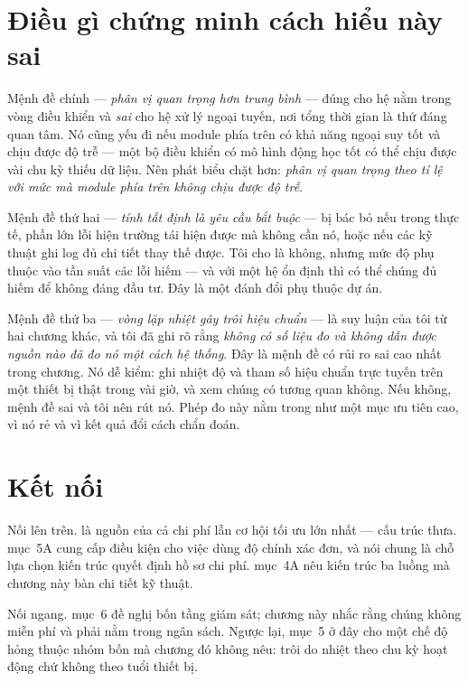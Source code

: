 \documentclass[../../vslam.tex]{subfiles}
\begin{document}
\section{Điều gì chứng minh cách hiểu này sai}

Mệnh đề chính --- \emph{phân vị quan trọng hơn trung bình} --- đúng cho hệ nằm trong vòng điều khiển và \emph{sai} cho hệ xử lý ngoại tuyến, nơi tổng thời gian là thứ đáng quan tâm. Nó cũng yếu đi nếu module phía trên có khả năng ngoại suy tốt và chịu được độ trễ --- một bộ điều khiển có mô hình động học tốt có thể chịu được vài chu kỳ thiếu dữ liệu. Nên phát biểu chặt hơn: \emph{phân vị quan trọng theo tỉ lệ với mức mà module phía trên không chịu được độ trễ}.

Mệnh đề thứ hai --- \emph{tính tất định là yêu cầu bắt buộc} --- bị bác bỏ nếu trong thực tế, phần lớn lỗi hiện trường tái hiện được mà không cần nó, hoặc nếu các kỹ thuật ghi log đủ chi tiết thay thế được. Tôi cho là không, nhưng mức độ phụ thuộc vào tần suất các lỗi hiếm --- và với một hệ ổn định thì có thể chúng đủ hiếm để không đáng đầu tư. Đây là một đánh đổi phụ thuộc dự án.

Mệnh đề thứ ba --- \emph{vòng lặp nhiệt gây trôi hiệu chuẩn} --- là suy luận của tôi từ hai chương khác, và tôi đã ghi rõ rằng \emph{không có số liệu đo và không dẫn được nguồn nào đã đo nó một cách hệ thống}. Đây là mệnh đề có rủi ro sai cao nhất trong chương. Nó dễ kiểm: ghi nhiệt độ và tham số hiệu chuẩn trực tuyến trên một thiết bị thật trong vài giờ, và xem chúng có tương quan không. Nếu không, mệnh đề sai và tôi nên rút nó. Phép đo này nằm trong  như một mục ưu tiên cao, vì nó rẻ và vì kết quả đổi cách chẩn đoán.

\section{Kết nối}

Nối lên trên.  là nguồn của cả chi phí lẫn cơ hội tối ưu lớn nhất --- cấu trúc thưa.  mục~5A cung cấp điều kiện cho việc dùng độ chính xác đơn, và nói chung là chỗ lựa chọn kiến trúc quyết định hồ sơ chi phí.  mục~4A nêu kiến trúc ba luồng mà chương này bàn chi tiết kỹ thuật.

Nối ngang.  mục~6 đề nghị bốn tầng giám sát; chương này nhắc rằng chúng không miễn phí và phải nằm trong ngân sách. Ngược lại, mục~5 ở đây cho  một chế độ hỏng thuộc nhóm bốn mà chương đó không nêu: trôi do nhiệt theo chu kỳ hoạt động chứ không theo tuổi thiết bị.
\end{document}
